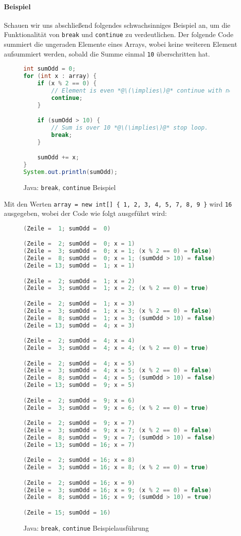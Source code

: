 		\paragraph{Beispiel}
			Schauen wir uns abschließend folgendes schwachsinniges Beispiel an, um die Funktionalität von \texttt{break} und \texttt{continue} zu verdeutlichen. Der folgende Code summiert die ungeraden Elemente eines Arrays, wobei keine weiteren Element aufsummiert werden, sobald die Summe einmal \texttt{10} überschritten hat.
			\begin{figure}[H]
				\centering
				\begin{lstlisting}[language = Java]
int sumOdd = 0;
for (int x : array) {
	if (x % 2 == 0) {
		// Element is even *@\(\implies\)@* continue with next element.
		continue;
	}

	if (sumOdd > 10) {
		// Sum is over 10 *@\(\implies\)@* stop loop.
		break;
	}

	sumOdd += x;
}
System.out.println(sumOdd);
				\end{lstlisting}
				\caption{Java: \texttt{break}, \texttt{continue} Beispiel}
			\end{figure}
			Mit den Werten \texttt{array = new int[] \{ 1, 2, 3, 4, 5, 7, 8, 9 \}} wird \texttt{16} ausgegeben, wobei der Code wie folgt ausgeführt wird:
			\begin{figure}[H]
				\centering
				\begin{lstlisting}[language = Java]
(Zeile =  1; sumOdd =  0)

(Zeile =  2; sumOdd =  0; x = 1)
(Zeile =  3; sumOdd =  0; x = 1; (x % 2 == 0) = false)
(Zeile =  8; sumOdd =  0; x = 1; (sumOdd > 10) = false)
(Zeile = 13; sumOdd =  1; x = 1)

(Zeile =  2; sumOdd =  1; x = 2)
(Zeile =  3; sumOdd =  1; x = 2; (x % 2 == 0) = true)

(Zeile =  2; sumOdd =  1; x = 3)
(Zeile =  3; sumOdd =  1; x = 3; (x % 2 == 0) = false)
(Zeile =  8; sumOdd =  1; x = 3; (sumOdd > 10) = false)
(Zeile = 13; sumOdd =  4; x = 3)

(Zeile =  2; sumOdd =  4; x = 4)
(Zeile =  3; sumOdd =  4; x = 4; (x % 2 == 0) = true)

(Zeile =  2; sumOdd =  4; x = 5)
(Zeile =  3; sumOdd =  4; x = 5; (x % 2 == 0) = false)
(Zeile =  8; sumOdd =  4; x = 5; (sumOdd > 10) = false)
(Zeile = 13; sumOdd =  9; x = 5)

(Zeile =  2; sumOdd =  9; x = 6)
(Zeile =  3; sumOdd =  9; x = 6; (x % 2 == 0) = true)

(Zeile =  2; sumOdd =  9; x = 7)
(Zeile =  3; sumOdd =  9; x = 7; (x % 2 == 0) = false)
(Zeile =  8; sumOdd =  9; x = 7; (sumOdd > 10) = false)
(Zeile = 13; sumOdd = 16; x = 7)

(Zeile =  2; sumOdd = 16; x = 8)
(Zeile =  3; sumOdd = 16; x = 8; (x % 2 == 0) = true)

(Zeile =  2; sumOdd = 16; x = 9)
(Zeile =  3; sumOdd = 16; x = 9; (x % 2 == 0) = false)
(Zeile =  8; sumOdd = 16; x = 9; (sumOdd > 10) = true)

(Zeile = 15; sumOdd = 16)
				\end{lstlisting}
				\caption{Java: \texttt{break}, \texttt{continue} Beispielausführung}
			\end{figure}
